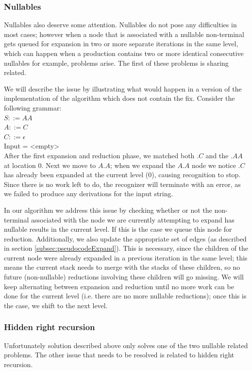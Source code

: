 \documentclass[a4paper,10pt]{article}
\begin{document}
\subsubsection{Nullables}
\label{subsec:nullables}
Nullables also deserve some attention. Nullables do not pose any difficulties in most cases; however when a node that is associated with a nullable non-terminal gets queued for expansion in two or more separate iterations in the same level, which can happen when a production contains two or more identical consecutive nullables for example, problems arise. The first of these problems is sharing related.

We will describe the issue by illustrating what would happen in a version of the implementation of the algorithm which does not contain the fix.
Consider the following grammar:\\
$S ::= AA$\\
$A ::= C$\\
$C ::= \epsilon$\\
Input = <empty>\\
After the first expansion and reduction phase, we matched both $.C$ and the $.AA$ at location $0$. Next we move to $A.A$; when we expand the $A.A$ node we notice $.C$ has already been expanded at the current level ($0$), causing recognition to stop. Since there is no work left to do, the recognizer will terminate with an error, as we failed to produce any derivations for the input string.

In our algorithm we address this issue by checking whether or not the non-terminal associated with the node we are currently attempting to expand has nullable results in the current level. If this is the case we queue this node for reduction. Additionally, we also update the appropriate set of edges (as described in section \ref{subsec:pseudocodeExpand}). This is necessary, since the children of the current node were already expanded in a previous iteration in the same level; this means the current stack needs to merge with the stacks of these children, so no future (non-nullable) reductions involving these children will go missing. We will keep alternating between expansion and reduction until no more work can be done for the current level (i.e. there are no more nullable reductions); once this is the case, we shift to the next level.

\subsubsection{Hidden right recursion}
\label{subsec:hiddenRightRecursion}
Unfortunately solution described above only solves one of the two nullable related problems. The other issue that needs to be resolved is related to hidden right recursion.
\end{document}
